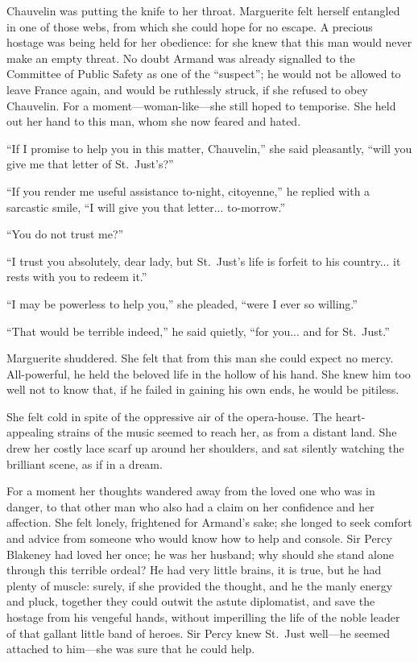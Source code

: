 \documentclass[paper=a5,BCOR=7mm,twoside,DIV=calc,12pt,usegeometry,chapterprefix,endperiod,headings=big]{scrbook}
\begin{document}
Chauvelin was putting the knife to her throat. Marguerite felt herself entangled in one of those webs, from which she could hope for no escape. A precious hostage was being held for her obedience: for she knew that this man would never make an empty threat. No doubt Armand was already signalled to the Committee of Public Safety as one of the \enquote{suspect}; he would not be allowed to leave France again, and would be ruthlessly struck, if she refused to obey Chauvelin. For a moment---woman-like---she still hoped to temporise. She held out her hand to this man, whom she now feared and hated.

\enquote{If I promise to help you in this matter, Chauvelin,} she said pleasantly, \enquote{will you give me that letter of St.~Just's?}

\enquote{If you render me useful assistance to-night, citoyenne,} he replied with a sarcastic smile, \enquote{I will give you that letter... to-morrow.}

\enquote{You do not trust me?}

\enquote{I trust you absolutely, dear lady, but St.~Just's life is forfeit to his country... it rests with you to redeem it.}

\enquote{I may be powerless to help you,} she pleaded, \enquote{were I ever so willing.}

\enquote{That would be terrible indeed,} he said quietly, \enquote{for you... and for St.~Just.}

Marguerite shuddered. She felt that from this man she could expect no mercy. All-powerful, he held the beloved life in the hollow of his hand. She knew him too well not to know that, if he failed in gaining his own ends, he would be pitiless.

She felt cold in spite of the oppressive air of the opera-house. The heart-appealing strains of the music seemed to reach her, as from a distant land. She drew her costly lace scarf up around her shoulders, and sat silently watching the brilliant scene, as if in a dream.

For a moment her thoughts wandered away from the loved one who was in danger, to that other man who also had a claim on her confidence and her affection. She felt lonely, frightened for Armand's sake; she longed to seek comfort and advice from someone who would know how to help and console. Sir Percy Blakeney had loved her once; he was her husband; why should she stand alone through this terrible ordeal? He had very little brains, it is true, but he had plenty of muscle: surely, if she provided the thought, and he the manly energy and pluck, together they could outwit the astute diplomatist, and save the hostage from his vengeful hands, without imperilling the life of the noble leader of that gallant little band of heroes. Sir Percy knew St.~Just well---he seemed attached to him---she was sure that he could help.
\end{document}
